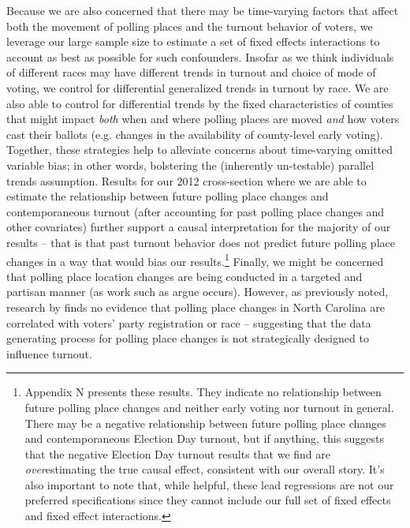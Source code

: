 \documentclass{cup_PSRM}
\begin{document}
Because we are also concerned that there may be time-varying factors that affect both the movement of polling places and the turnout behavior of voters, we leverage our large sample size to estimate a set of fixed effects interactions to account as best as possible for such confounders.  Insofar as we think individuals of different races may have different trends in turnout and choice of mode of voting, we control for differential generalized trends in turnout by race.  We are also able to control for differential trends by the fixed characteristics of counties that might impact \emph{both} when and where polling places are moved \emph{and} how voters cast their ballots  (e.g. changes in the availability of county-level early voting).  Together, these strategies help to alleviate concerns about time-varying omitted variable bias; in other words, bolstering the (inherently un-testable) parallel trends assumption. Results for our 2012 cross-section where we are able to estimate the relationship between future polling place changes and contemporaneous turnout (after accounting for past polling place changes and other covariates) further support a causal interpretation for the majority of our results -- that is that past turnout behavior does not predict future polling place changes in a way that would bias our results.\footnote{Appendix N presents these results. They indicate no relationship between future polling place changes and neither early voting nor turnout in general.  There may be a negative relationship between future polling place changes and contemporaneous Election Day turnout, but if anything, this suggests that the negative Election Day turnout results that we find are \emph{over}estimating the true causal effect, consistent with our overall story.  It's also important to note that, while helpful, these lead regressions are not our preferred specifications since they cannot include our full set of fixed effects and fixed effect interactions. } Finally, we might be concerned that polling place location changes are being conducted in a targeted and partisan manner (as work such as \cite{amos2017reprecincting} argue occurs).  However, as previously noted, research by \cite{clintontargering2018} finds no evidence that polling place changes in North Carolina  are correlated with voters' party registration or race -- suggesting that the data generating process for polling place changes is not strategically designed to influence turnout.
\end{document}

